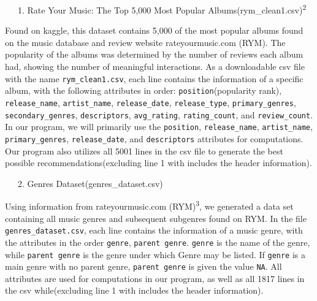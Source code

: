\documentclass[fontsize=11pt]{article}
\begin{document}
~~~1. Rate Your Music: The Top 5,000 Most Popular Albums(rym\_clean1.csv)\textsuperscript{2} \newline

Found on kaggle, this dataset contains 5,000 of the most popular albums found on the music database and review website rateyourmusic.com (RYM). The popularity of the albums was determined by the number of reviews each album had, showing the number of meaningful interactions. As a downloadable csv file with the name \texttt{rym\_clean1.csv}, each line contains the information of a specific album, with the following attributes in order: \texttt{position}(popularity rank), \texttt{release\_name}, \texttt{artist\_name}, \texttt{release\_date}, \texttt{release\_type}, \texttt{primary\_genres}, \texttt{secondary\_genres}, \texttt{descriptors}, \texttt{avg\_rating}, \texttt{rating\_count}, and \texttt{review\_count}. In our program, we will primarily use the \texttt{position}, \texttt{release\_name}, \texttt{artist\_name}, \texttt{primary\_genres}, \texttt{release\_date}, and \texttt{descriptors} attributes for computations. Our program also utilizes all 5001 lines in the csv file to generate the best possible recommendations(excluding line 1 with includes the header information). \newline

~~~2. Genres Dataset(genres\_dataset.csv) \newline

Using information from rateyourmusic.com (RYM)\textsuperscript{3}, we generated a data set containing all music genres and subsequent subgenres found on RYM. In the file \texttt{genres\_dataset.csv}, each line contains the information of a music genre, with the attributes in the order \texttt{genre}, \texttt{parent genre}. \texttt{genre} is the name of the genre, while \texttt{parent genre} is the genre under which Genre may be listed. If \texttt{genre} is a main genre with no parent genre, \texttt{parent genre} is given the value \texttt{NA}. All attributes are used for computations in our program, as well as all 1817 lines in the csv while(excluding line 1 with includes the header information). \newline
\end{document}

